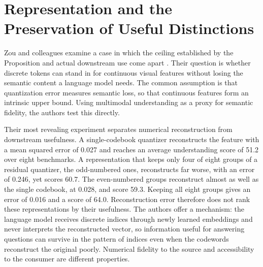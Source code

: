 \documentclass[11pt]{article}
\theoremstyle{remark}
\begin{document}
\section{Representation and the Preservation of Useful Distinctions}

Zou and colleagues examine a case in which the ceiling established by the Proposition and actual downstream use come apart \cite{zou2026}. Their question is whether discrete tokens can stand in for continuous visual features without losing the semantic content a language model needs. The common assumption is that quantization error measures semantic loss, so that continuous features form an intrinsic upper bound. Using multimodal understanding as a proxy for semantic fidelity, the authors test this directly.

Their most revealing experiment separates numerical reconstruction from downstream usefulness. A single-codebook quantizer reconstructs the feature with a mean squared error of 0.027 and reaches an average understanding score of 51.2 over eight benchmarks. A representation that keeps only four of eight groups of a residual quantizer, the odd-numbered ones, reconstructs far worse, with an error of 0.246, yet scores 60.7. The even-numbered groups reconstruct almost as well as the single codebook, at 0.028, and score 59.3. Keeping all eight groups gives an error of 0.016 and a score of 64.0. Reconstruction error therefore does not rank these representations by their usefulness. The authors offer a mechanism: the language model receives discrete indices through newly learned embeddings and never interprets the reconstructed vector, so information useful for answering questions can survive in the pattern of indices even when the codewords reconstruct the original poorly. Numerical fidelity to the source and accessibility to the consumer are different properties.
\end{document}
